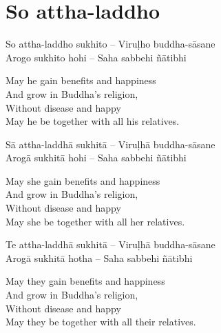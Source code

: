 
\section{So attha-laddho}

\begin{twochants}
  So attha-laddho sukhito – Viruḷho buddha-sāsane\\
  Arogo sukhito hohi – Saha sabbehi ñātibhi
\end{twochants}

\begin{english}
  May he gain benefits and happiness\\
  And grow in Buddha’s religion,\\
  Without disease and happy\\
  May he be together with all his relatives.
\end{english}

\begin{twochants}
  Sā attha-laddhā sukhitā – Viruḷhā buddha-sāsane\\
  Arogā sukhitā hohi – Saha sabbehi ñātibhi
\end{twochants}

\begin{english}
  May she gain benefits and happiness\\
  And grow in Buddha’s religion,\\
  Without disease and happy\\
  May she be together with all her relatives.
\end{english}

\begin{twochants}
  Te attha-laddhā sukhitā – Viruḷhā buddha-sāsane\\
  Arogā sukhitā hotha – Saha sabbehi ñātibhi
\end{twochants}

\begin{english}
  May they gain benefits and happiness\\
  And grow in Buddha’s religion,\\
  Without disease and happy\\
  May they be together with all their relatives.
\end{english}

